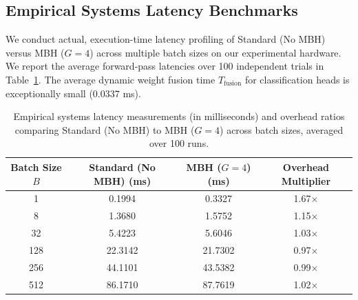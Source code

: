 \documentclass{article}
\theoremstyle{plain}
\theoremstyle{definition}
\theoremstyle{remark}
\begin{document}
\subsection{Empirical Systems Latency Benchmarks}
We conduct actual, execution-time latency profiling of Standard (No MBH) versus MBH ($G=4$) across multiple batch sizes on our experimental hardware. We report the average forward-pass latencies over 100 independent trials in Table~\ref{tab:latency_benchmarks}. The average dynamic weight fusion time $T_{\text{fusion}}$ for classification heads is exceptionally small ($0.0337$ ms).

\begin{table}[htbp]
\centering
\caption{Empirical systems latency measurements (in milliseconds) and overhead ratios comparing Standard (No MBH) to MBH ($G=4$) across batch sizes, averaged over 100 runs.}
\label{tab:latency_benchmarks}
\vskip 0.15in
\begin{tabular}{cccc}
\toprule
Batch Size $B$ & Standard (No MBH) (ms) & MBH ($G=4$) (ms) & Overhead Multiplier \\
\midrule
1   & 0.1994 & 0.3327 & 1.67$\times$ \\
8   & 1.3680 & 1.5752 & 1.15$\times$ \\
32  & 5.4223 & 5.6046 & 1.03$\times$ \\
128 & 22.3142 & 21.7302 & 0.97$\times$ \\
256 & 44.1101 & 43.5382 & 0.99$\times$ \\
512 & 86.1710 & 87.7619 & 1.02$\times$ \\
\bottomrule
\end{tabular}
\end{table}
\end{document}
